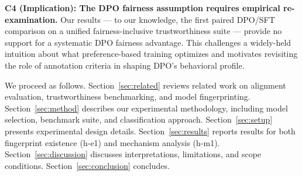 \textbf{C4 (Implication): The DPO fairness assumption requires empirical re-examination.}
Our results --- to our knowledge, the first paired DPO/SFT comparison on a unified fairness-inclusive
trustworthiness suite --- provide no support for a systematic DPO fairness advantage.
This challenges a widely-held intuition about what preference-based training optimizes
and motivates revisiting the role of annotation criteria in shaping DPO's behavioral
profile.

We proceed as follows. Section~\ref{sec:related} reviews related work on alignment evaluation,
trustworthiness benchmarking, and model fingerprinting. Section~\ref{sec:method} describes our
experimental methodology, including model selection, benchmark suite, and classification
approach. Section~\ref{sec:setup} presents experimental design details. Section~\ref{sec:results} reports results
for both fingerprint existence (h-e1) and mechanism analysis (h-m1). Section~\ref{sec:discussion} discusses
interpretations, limitations, and scope conditions. Section~\ref{sec:conclusion} concludes.
